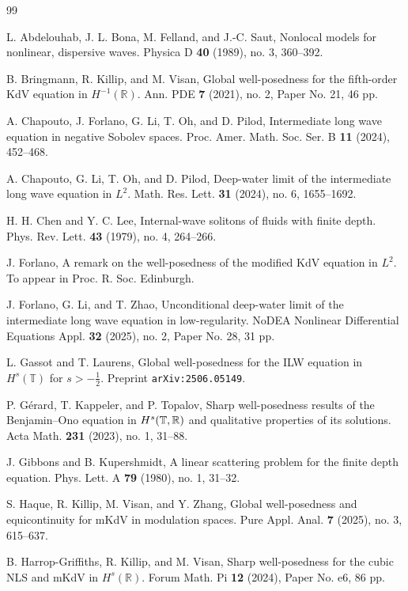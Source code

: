 \documentclass{amsart}
\theoremstyle{definition}
\theoremstyle{remark}
\begin{document}
\begin{thebibliography}{99}

L. Abdelouhab, J. L. Bona, M. Felland, and J.-C. Saut,
Nonlocal models for nonlinear, dispersive waves.
Physica D \textbf{40} (1989), no. 3, 360--392.

B. Bringmann, R. Killip, and M. Visan,
Global well-posedness for the fifth-order KdV equation in $H^{-1}(\mathbb R)$.
Ann. PDE \textbf{7} (2021), no. 2, Paper No. 21, 46 pp.

A. Chapouto, J. Forlano, G. Li, T. Oh, and D. Pilod,
Intermediate long wave equation in negative Sobolev spaces.
Proc. Amer. Math. Soc. Ser. B \textbf{11} (2024), 452--468.

A. Chapouto, G. Li, T. Oh, and D. Pilod,
Deep-water limit of the intermediate long wave equation in $L^2$.
Math. Res. Lett. \textbf{31} (2024), no. 6, 1655--1692.

H. H. Chen and Y. C. Lee,
Internal-wave solitons of fluids with finite depth.
Phys. Rev. Lett. \textbf{43} (1979), no. 4, 264--266.

J. Forlano, 
A remark on the well-posedness of the modified KdV equation in $L^2$.
To appear in Proc. R. Soc. Edinburgh.


J. Forlano, G. Li, and T. Zhao,
Unconditional deep-water limit of the intermediate long wave equation in low-regularity.
NoDEA Nonlinear Differential Equations Appl. \textbf{32} (2025), no. 2, Paper No. 28, 31 pp.

L. Gassot and T. Laurens,
Global well-posedness for the ILW equation in $H^s(\mathbb{T})$ for $s>-\frac12$. 
Preprint \texttt{arXiv:2506.05149}.

P. G\'erard, T. Kappeler, and P. Topalov,
Sharp well-posedness results of the {B}enjamin--{O}no equation in {$H^s(\Bbb T,\Bbb R)$} and qualitative properties of its solutions.
Acta Math. \textbf{231} (2023), no. 1, 31--88.

J. Gibbons and B. Kupershmidt,
A linear scattering problem for the finite depth equation.
Phys. Lett. A \textbf{79} (1980), no. 1, 31--32.

S. Haque, R. Killip, M. Visan, and Y. Zhang,
Global well-posedness and equicontinuity for mKdV in modulation spaces.
Pure Appl. Anal. \textbf{7} (2025), no. 3, 615--637.

B. Harrop-Griffiths, R. Killip, and M. Visan,
Sharp well-posedness for the cubic NLS and mKdV in $H^s(\mathbb R)$.
Forum Math. Pi \textbf{12} (2024), Paper No. e6, 86 pp.


\end{thebibliography}
\end{document}
